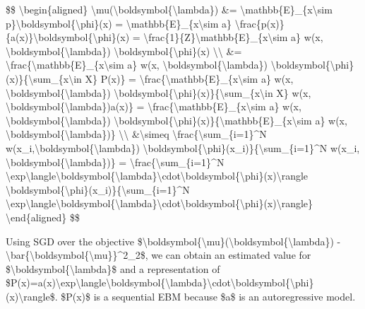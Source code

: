 \$\$ \textbackslash begin\{aligned\} \textbackslash mu(\textbackslash boldsymbol\{\textbackslash lambda\}) \&= \textbackslash mathbb\{E\}\_\{x\textbackslash sim p\}\textbackslash boldsymbol\{\textbackslash phi\}(x) = \textbackslash mathbb\{E\}\_\{x\textbackslash sim a\} \textbackslash frac\{p(x)\}\{a(x)\}\textbackslash boldsymbol\{\textbackslash phi\}(x) = \textbackslash frac\{1\}\{Z\}\textbackslash mathbb\{E\}\_\{x\textbackslash sim a\} w(x, \textbackslash boldsymbol\{\textbackslash lambda\}) \textbackslash boldsymbol\{\textbackslash phi\}(x) \textbackslash\textbackslash{} \&= \textbackslash frac\{\textbackslash mathbb\{E\}\_\{x\textbackslash sim a\} w(x, \textbackslash boldsymbol\{\textbackslash lambda\}) \textbackslash boldsymbol\{\textbackslash phi\}(x)\}\{\textbackslash sum\_\{x\textbackslash in X\} P(x)\} = \textbackslash frac\{\textbackslash mathbb\{E\}\_\{x\textbackslash sim a\} w(x, \textbackslash boldsymbol\{\textbackslash lambda\}) \textbackslash boldsymbol\{\textbackslash phi\}(x)\}\{\textbackslash sum\_\{x\textbackslash in X\} w(x, \textbackslash boldsymbol\{\textbackslash lambda\})a(x)\} = \textbackslash frac\{\textbackslash mathbb\{E\}\_\{x\textbackslash sim a\} w(x, \textbackslash boldsymbol\{\textbackslash lambda\}) \textbackslash boldsymbol\{\textbackslash phi\}(x)\}\{\textbackslash mathbb\{E\}\_\{x\textbackslash sim a\} w(x, \textbackslash boldsymbol\{\textbackslash lambda\})\} \textbackslash\textbackslash{} \&\textbackslash simeq \textbackslash frac\{\textbackslash sum\_\{i=1\}\^{}N w(x\_i,\textbackslash boldsymbol\{\textbackslash lambda\}) \textbackslash boldsymbol\{\textbackslash phi\}(x\_i)\}\{\textbackslash sum\_\{i=1\}\^{}N w(x\_i, \textbackslash boldsymbol\{\textbackslash lambda\})\} = \textbackslash frac\{\textbackslash sum\_\{i=1\}\^{}N \textbackslash exp\textbackslash langle\textbackslash boldsymbol\{\textbackslash lambda\}\textbackslash cdot\textbackslash boldsymbol\{\textbackslash phi\}(x)\textbackslash rangle \textbackslash boldsymbol\{\textbackslash phi\}(x\_i)\}\{\textbackslash sum\_\{i=1\}\^{}N \textbackslash exp\textbackslash langle\textbackslash boldsymbol\{\textbackslash lambda\}\textbackslash cdot\textbackslash boldsymbol\{\textbackslash phi\}(x)\textbackslash rangle\} \textbackslash end\{aligned\} \$\$

Using SGD over the objective \$\textbar\textbackslash boldsymbol\{\textbackslash mu\}(\textbackslash boldsymbol\{\textbackslash lambda\}) - \textbackslash bar\{\textbackslash boldsymbol\{\textbackslash mu\}\}\textbar\^{}2\_2\$, we can obtain an estimated value for \$\textbackslash boldsymbol\{\textbackslash lambda\}\$ and a representation of \$P(x)=a(x)\textbackslash exp\textbackslash langle\textbackslash boldsymbol\{\textbackslash lambda\}\textbackslash cdot\textbackslash boldsymbol\{\textbackslash phi\}(x)\textbackslash rangle\$. \$P(x)\$ is a sequential EBM because \$a\$ is an autoregressive model.

